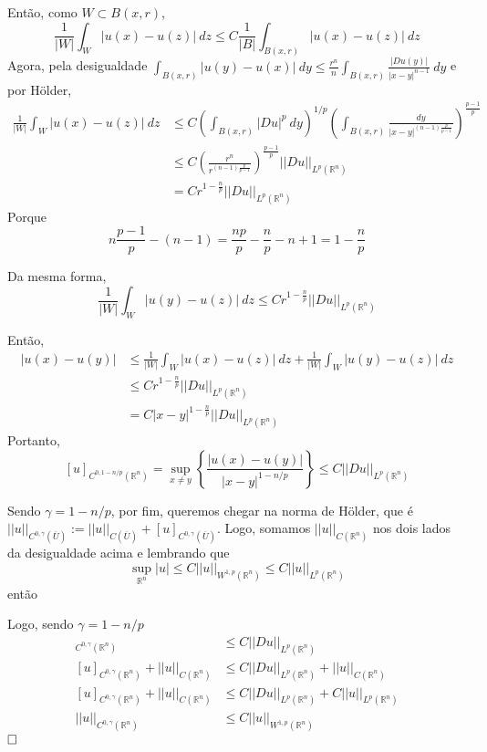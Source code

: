 \documentclass[a4paper, 11pt]{book}
\newcommand{\qed}{$\hfill\square$}
\newcommand{\Rn}{{\mathbb{R}^n}}
\newcommand{\rn}{{\mathbb{R}^n}}
\begin{document}
Então, como $W \subset B(x,r)$, \[ \frac{1}{|W|} \int_W |u(x) - u(z)| \ dz \leq C \frac{1}{|B|} \int_{B(x,r)} |u(x) - u(z)|\ dz \] Agora, pela desigualdade $ \int_{ B(x,r)} | u(y) - u(x) |\ dy \leq \frac{r^n}{n} \int_{B(x,r)} \frac{|Du(y)|}{|x-y|^{n-1}}\ dy  $ e por Hölder, \begin{align*}
	 \frac{1}{|W|} \int_W |u(x) - u(z)| \ dz &\leq C \left(\int_{B(x,r)} |Du|^p \ dy \right)^{1/p}      \left(  \int_{B(x,r)} \frac{dy}{|x-y|^{(n-1)\frac{p}{p-1}}}  \right)^{\frac{p-1}{p}} \\
	 &\leq C \left( \frac{r^n}{r^{(n-1)\frac{p}{p-1}}}\right)^{\frac{p-1}{p}} ||Du||_{L^p(\rn)} \\
	 &= Cr^{1-\frac{n}{p}} ||Du||_{L^p(\rn)}
\end{align*} Porque \[ n\frac{p-1}{p} - (n-1) = \frac{np}{p} - \frac{n}{p} -n + 1 = 1 - \frac{n}{p}\]

Da mesma forma, \[ \frac{1}{|W|} \int_W |u(y) - u(z)| \ dz \leq C r^{1-\frac{n}{p}} ||Du||_{L^p(\rn)} \]

Então, \begin{align*}
	|u(x) - u(y)| &\leq \frac{1}{|W|}\int_W |u(x) -u(z)|\ dz + \frac{1}{|W|} \int_W |u(y) - u(z)| \ dz \\
	&\leq Cr^{1-\frac{n}{p}} ||Du||_{L^p(\rn)}\\
	&= C|x-y|^{1-\frac{n}{p}} ||Du||_{L^p(\rn)}
\end{align*} Portanto, \[ [u]_{C^{0, 1-n/p}(\rn)} = \sup_{x\neq y} \left\{ \frac{|u(x) - u(y)|}{|x-y|^{1-n/p}}\right\}   \leq C   ||Du||_{L^p(\rn)}    \]

Sendo $\gamma = 1 - n/p$, por fim, queremos chegar na norma de Hölder, que é $ ||u||_{C^{0,\gamma}(\overline{U})} := ||u||_{C(\overline{U})} + [u]_{C^{0,\gamma}(\overline{U})}  $. Logo, somamos $||u||_{C(\Rn)}$ nos dois lados da desigualdade acima e lembrando que \[ \sup_{\rn} |u| \leq C ||u||_{W^{1,p}(\rn)} \leq C ||u||_{L^p(\rn)}\] então

Logo, sendo $\gamma = 1 - n/p$ \begin{align*}
	[u]_{C^{0,\gamma}(\rn)}&\leq C ||Du||_{L^p(\rn)}  \\
	[u]_{C^{0,\gamma}(\rn)} + ||u||_{C(\rn)} &\leq C ||Du||_{L^p(\rn)} + ||u||_{C(\rn)} \\
	[u]_{C^{0,\gamma}(\rn)} + ||u||_{C(\rn)} &\leq C ||Du||_{L^p(\rn)} + C||u||_{L^p(\rn)} \\
	||u||_{C^{0,\gamma}(\rn)} & \leq C ||u||_{W^{1,p}(\rn)}
\end{align*}\qed
\end{document}

